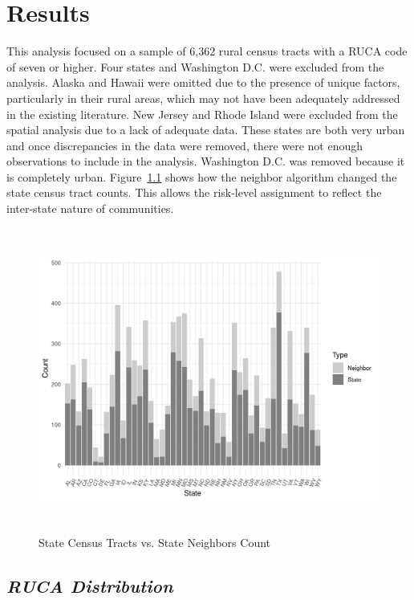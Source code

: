 \chapter{Results}	

This analysis focused on a sample of 6,362 rural census tracts with a RUCA code of seven or higher. Four states and Washington D.C. were excluded from the analysis. Alaska and Hawaii were omitted due to the presence of unique factors, particularly in their rural areas, which may not have been adequately addressed in the existing literature.  New Jersey and Rhode Island were excluded from the spatial analysis due to a lack of adequate data. These states are both very urban and once discrepancies in the data were removed, there were not enough observations to include in the analysis. Washington D.C. was removed because it is completely urban. Figure~\ref{fig:neighbors_bar} 
shows how the neighbor algorithm changed the state census tract counts. This allows the risk-level assignment to reflect the inter-state nature of communities. 


\begin{figure}[htbp]
   \centering
    \includegraphics[width=1\textwidth, height=10cm]{plots/neighbors.png}
    \caption{State Census Tracts vs. State Neighbors Count}
    \label{fig:neighbors_bar}
\end{figure}

\pagebreak

\section{\textit{RUCA Distribution}}

